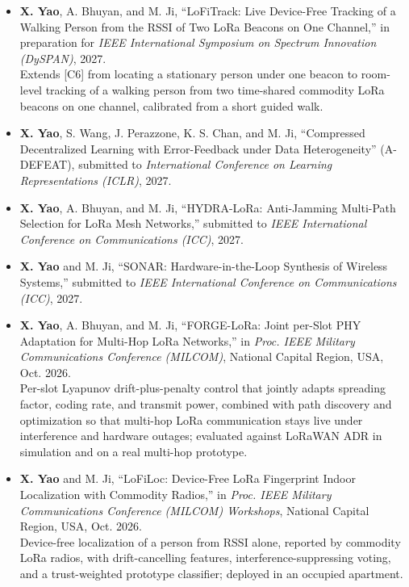 \documentclass[10pt]{article}
\begin{document}
\begin{itemize}[leftmargin=3.9em,labelwidth=3.5em,labelsep=0.4em,align=left]
\item[{[C1(P)]}] \textbf{X. Yao}, A. Bhuyan, and M. Ji, ``LoFiTrack: Live Device-Free Tracking of a Walking Person from the RSSI of Two LoRa Beacons on One Channel,'' in preparation for \emph{IEEE International Symposium on Spectrum Innovation (DySPAN)}, 2027.\\
{\small Extends [C6] from locating a stationary person under one beacon to room-level tracking of a walking person from two time-shared commodity LoRa beacons on one channel, calibrated from a short guided walk.}
\item[{[C2(S)]}] \textbf{X. Yao}, S. Wang, J. Perazzone, K. S. Chan, and M. Ji, ``Compressed Decentralized Learning with Error-Feedback under Data Heterogeneity'' (A-DEFEAT), submitted to \emph{International Conference on Learning Representations (ICLR)}, 2027.
\item[{[C3(S)]}] \textbf{X. Yao}, A. Bhuyan, and M. Ji, ``HYDRA-LoRa: Anti-Jamming Multi-Path Selection for LoRa Mesh Networks,'' submitted to \emph{IEEE International Conference on Communications (ICC)}, 2027.
\item[{[C4(S)]}] \textbf{X. Yao} and M. Ji, ``SONAR: Hardware-in-the-Loop Synthesis of Wireless Systems,'' submitted to \emph{IEEE International Conference on Communications (ICC)}, 2027.
\item[{[C5]}] \textbf{X. Yao}, A. Bhuyan, and M. Ji, ``FORGE-LoRa: Joint per-Slot PHY Adaptation for Multi-Hop LoRa Networks,'' in \emph{Proc. IEEE Military Communications Conference (MILCOM)}, National Capital Region, USA, Oct. 2026.\\
{\small Per-slot Lyapunov drift-plus-penalty control that jointly adapts spreading factor, coding rate, and transmit power, combined with path discovery and optimization so that multi-hop LoRa communication stays live under interference and hardware outages; evaluated against LoRaWAN ADR in simulation and on a real multi-hop prototype.}
\item[{[C6]}] \textbf{X. Yao} and M. Ji, ``LoFiLoc: Device-Free LoRa Fingerprint Indoor Localization with Commodity Radios,'' in \emph{Proc. IEEE Military Communications Conference (MILCOM) Workshops}, National Capital Region, USA, Oct. 2026.\\
{\small Device-free localization of a person from RSSI alone, reported by commodity LoRa radios, with drift-cancelling features, interference-suppressing voting, and a trust-weighted prototype classifier; deployed in an occupied apartment.}

\end{itemize}
\end{document}

